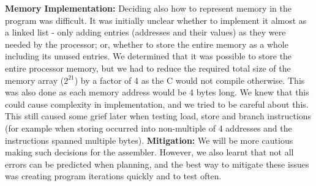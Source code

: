 \documentclass[11pt]{article}
\begin{document}
\textbf{Memory Implementation:} Deciding also how to represent memory in the program was difficult. It was initially unclear whether to implement it almost as a linked list - only adding entries (addresses and their values) as they were needed by the processor; or, whether to store the entire memory as a whole including its unused entries. We determined that it was possible to store the entire processor memory, but we had to reduce the required total size of the memory array ($2^{21}$) by a factor of 4 as the C would not compile otherwise. This was also done as each memory address would be 4 bytes long. We knew that this could cause complexity in implementation, and we tried to be careful about this. This still caused some grief later when testing load, store and branch instructions (for example when storing occurred into non-multiple of 4 addresses and the instructions spanned multiple bytes). \textbf{Mitigation:} We will be more cautious making such decisions for the assembler. However, we also learnt that not all errors can be predicted when planning, and the best way to mitigate these issues was creating program iterations quickly and to test often.
\end{document}

